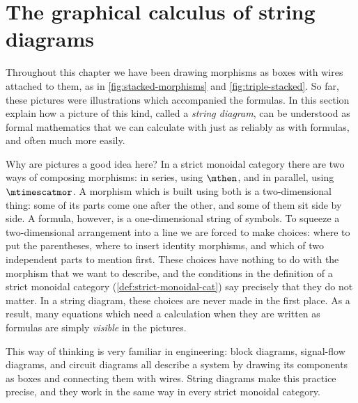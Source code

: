 
\section{The graphical calculus of string diagrams}\label{sec:graphical-calculus}


Throughout this chapter we have been drawing morphisms as boxes with wires attached to them, as in \cref{fig:stacked-morphisms} and \cref{fig:triple-stacked}.
So far, these pictures were illustrations which accompanied the formulas.
In this section explain how a picture of this kind, called a \emph{string diagram}, can be understood as formal mathematics that we can calculate with just as reliably as with formulas, and often much more easily.

Why are pictures a good idea here?
In a strict monoidal category there are two ways of composing morphisms: in series, using $\mthen$, and in parallel, using $\mtimescatmor$.
A morphism which is built using both is a two-dimensional thing: some of its parts come one after the other, and some of them sit side by side.
A formula, however, is a one-dimensional string of symbols.
To squeeze a two-dimensional arrangement into a line we are forced to make choices: where to put the parentheses, where to insert identity morphisms, and which of two independent parts to mention first.
These choices have nothing to do with the morphism that we want to describe, and the conditions in the definition of a strict monoidal category (\cref{def:strict-monoidal-cat}) say precisely that they do not matter.
In a string diagram, these choices are never made in the first place.
As a result, many equations which need a calculation when they are written as formulas are simply \emph{visible} in the pictures.

This way of thinking is very familiar in engineering: block diagrams, signal-flow diagrams, and circuit diagrams all describe a system by drawing its components as boxes and connecting them with wires.
String diagrams make this practice precise, and they work in the same way in every strict monoidal category.

